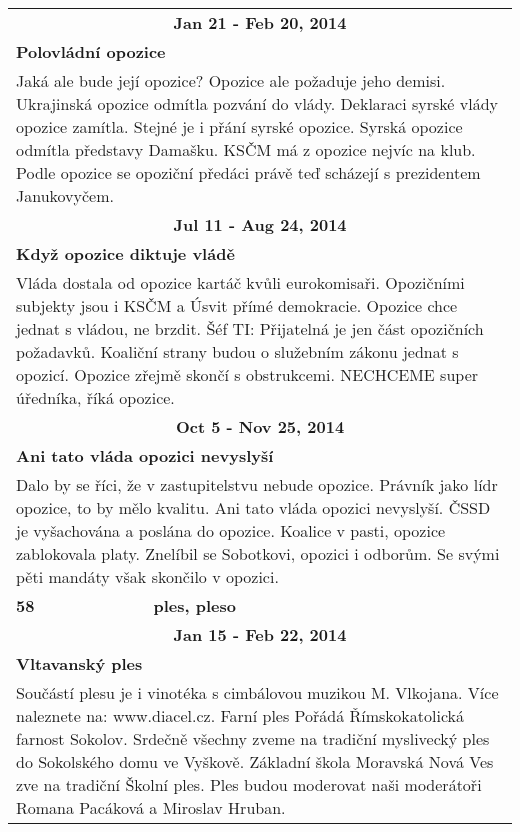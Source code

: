 \begin{tabularx}{\linewidth}{l l}
                \multicolumn{2}{c}{\bf Jan 21 - Feb 20, 2014} \\
                \multicolumn{2}{p{\linewidth}}{\bf Polovládní opozice} \\
                \multicolumn{2}{p{\linewidth}}{Jaká ale bude její opozice? Opozice ale požaduje jeho demisi. Ukrajinská opozice odmítla pozvání do vlády. Deklaraci syrské vlády opozice zamítla. Stejné je i přání syrské opozice. Syrská opozice odmítla představy Damašku. KSČM má z opozice nejvíc na klub. Podle opozice se opoziční předáci právě teď scházejí s prezidentem Janukovyčem.} \\ \midrule
                
                \multicolumn{2}{c}{\bf Jul 11 - Aug 24, 2014} \\
                \multicolumn{2}{p{\linewidth}}{\bf Když opozice diktuje vládě} \\
                \multicolumn{2}{p{\linewidth}}{Vláda dostala od opozice kartáč kvůli eurokomisaři. Opozičními subjekty jsou i KSČM a Úsvit přímé demokracie. Opozice chce jednat s vládou, ne brzdit. Šéf TI: Přijatelná je jen část opozičních požadavků. Koaliční strany budou o služebním zákonu jednat s opozicí. Opozice zřejmě skončí s obstrukcemi. NECHCEME super úředníka, říká opozice.} \\ \midrule
                
                \multicolumn{2}{c}{\bf Oct 5 - Nov 25, 2014} \\
                \multicolumn{2}{p{\linewidth}}{\bf Ani tato vláda opozici nevyslyší} \\
                \multicolumn{2}{p{\linewidth}}{Dalo by se říci, že v zastupitelstvu nebude opozice. Právník jako lídr opozice, to by mělo kvalitu. Ani tato vláda opozici nevyslyší. ČSSD je vyšachována a poslána do opozice. Koalice v pasti, opozice zablokovala platy. Znelíbil se Sobotkovi, opozici i odborům. Se svými pěti mandáty však skončilo v opozici.} \\ \midrule
                [1.5pt]

            \bf 58 & \bf ples, pleso \\ \midrule
            
                \multicolumn{2}{c}{\bf Jan 15 - Feb 22, 2014} \\
                \multicolumn{2}{p{\linewidth}}{\bf Vltavanský ples} \\
                \multicolumn{2}{p{\linewidth}}{Součástí plesu je i vinotéka s cimbálovou muzikou M. Vlkojana. Více naleznete na: www.diacel.cz. Farní ples Pořádá Římskokatolická farnost Sokolov. Srdečně všechny zveme na tradiční myslivecký ples do Sokolského domu ve Vyškově. Základní škola Moravská Nová Ves zve na tradiční Školní ples. Ples budou moderovat naši moderátoři Romana Pacáková a Miroslav Hruban.} \\ \midrule
                [1.5pt]


\end{tabularx}
